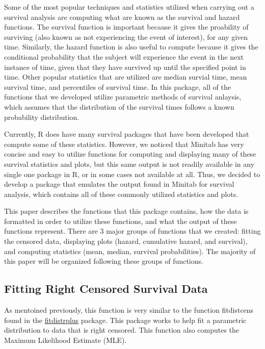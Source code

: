 Some of the most popular techniques and statistics utilized when
carrying out a survival analysis are computing what are known as the
survival and hazard functions. The survival function is important
because it gives the proability of surviving (also known as not
experiencing the event of interest), for any given time. Similarly, the
hazard function is also useful to compute because it gives the
conditional probability that the subject will experience the event in
the next instance of time, given that they have survived up until the
specified point in time. Other popular statistics that are utilized are
median survial time, mean survival time, and percentiles of survival
time. In this package, all of the functions that we developed utilize
parametric methods of survival anlaysis, which assumes that the
distribution of the survival times follows a known probability
distribution.

Currently, R does have many survival packages that have been developed
that compute some of these statistics. However, we noticed that Minitab
has very concise and easy to utilize functions for computing and
displaying many of these survival statistics and plots, but this same
output is not readily available in any single one package in R, or in
some cases not available at all. Thus, we decided to develop a package
that emulates the output found in Minitab for survival analysis, which
contains all of these commonly utilized statistics and plots.

This paper describes the functions that this package contains, how the
data is formatted in order to utilize these functions, and what the
output of these functions represent. There are 3 major groups of
functions that we created: fitting the censored data, displaying plots
(hazard, cumulative hazard, and survival), and computing statistics
(mean, median, survival probabilities). The majority of this paper will
be organized following these groups of functions.

\hypertarget{fitting-right-censored-survival-data}{%
\subsection{Fitting Right Censored Survival
Data}\label{fitting-right-censored-survival-data}}

As mentoined previously, this function is very similar to the function
fitdistcens found in the
\href{https://cran.r-project.org/web/packages/fitdistrplus/index.html}{fitdistrplus}
package. This package works to help fit a parametric distribution to
data that is right censored. This function also computes the Maximum
Likelihood Estimate (MLE).

